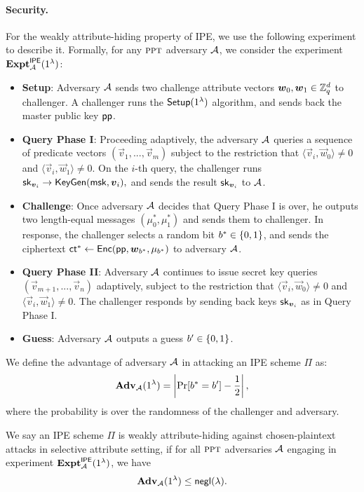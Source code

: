 \paragraph{Security.} For the weakly attribute-hiding property of IPE, we use the following experiment to describe it. Formally, for any $\textsc{ppt}$ adversary $\mathcal{A}$, we consider the experiment $\mathbf{Expt}_{\mathcal{A}}^{\mathsf{IPE}}(1^\lambda)$:
\begin{itemize}[leftmargin=*]
 \item \textbf{Setup}: Adversary $\mathcal{A}$ sends two challenge attribute vectors $\boldsymbol{w}_{0}, \boldsymbol{w}_{1} \in \mathbb{Z}_q^d$ to challenger.  A challenger runs the $\mathsf{Setup}(1^\lambda)$ algorithm, and sends back the master public key $\mathsf{pp}$.
 \item \textbf{Query Phase I}: Proceeding adaptively, the adversary $\mathcal{A}$ queries a sequence of predicate vectors $(\vec{v}_1,..., \vec{v}_m)$ subject to the restriction that $\langle \vec{v}_i, \vec{w}_{0} \rangle \neq 0$ and $\langle \vec{v}_i, \vec{w}_{1} \rangle \neq 0$. On the $i$-th query, the challenger runs $\mathsf{sk}_{\boldsymbol{v}_i} \rightarrow \mathsf{KeyGen}(\mathsf{msk}, \boldsymbol{v}_i),$ and sends the result $\mathsf{sk}_{\boldsymbol{v}_i}$ to $\mathcal{A}$.
 \item \textbf{Challenge}: Once adversary $\mathcal{A}$ decides that Query Phase I is over, he outputs two length-equal messages $(\mu^*_0, \mu^*_1)$ and sends them to challenger.  In response, the challenger selects a random bit $b^* \in \{0,1\}$, and sends the ciphertext $\mathsf{ct}^* \leftarrow \mathsf{Enc}(\mathsf{pp}, \boldsymbol{w}_{b^*}, \mu_{b^*})$ to adversary $\mathcal{A}$.
 \item \textbf{Query Phase II}: Adversary $\mathcal{A}$ continues to issue secret key queries $(\vec{v}_{m + 1},..., \vec{v}_{n})$ adaptively, subject to the restriction that $\langle \vec{v}_i, \vec{w}_{0} \rangle \neq 0$ and $\langle \vec{v}_i, \vec{w}_{1} \rangle \neq 0$. The challenger responds by sending back keys $\mathsf{sk}_{\boldsymbol{v}_i}$ as in Query Phase I.
 \item \textbf{Guess}: Adversary $\mathcal{A}$ outputs a guess $b' \in \{0,1\}$.
\end{itemize}
We define the advantage of adversary $\mathcal{A}$ in attacking an IPE scheme $\Pi$ as:
$$\mathbf{Adv}_{\mathcal{A}}(1^\lambda) = \left|\Pr[b^* = b'] - \frac{1}{2}\right|,$$
\noindent where the probability is over the randomness of the challenger and adversary.

\begin{definition}\label{defn:sec}
We say an IPE scheme $\Pi$ is weakly attribute-hiding against chosen-plaintext attacks in selective attribute setting, if for all $\textsc{ppt}$ adversaries $\mathcal{A}$ engaging in experiment $\mathbf{Expt}_{\mathcal{A}}^{\mathsf{IPE}}(1^\lambda)$, we have
$$\mathbf{Adv}_{\mathcal{A}}(1^\lambda) \leq \mathsf{negl}(\lambda).$$
\end{definition}

